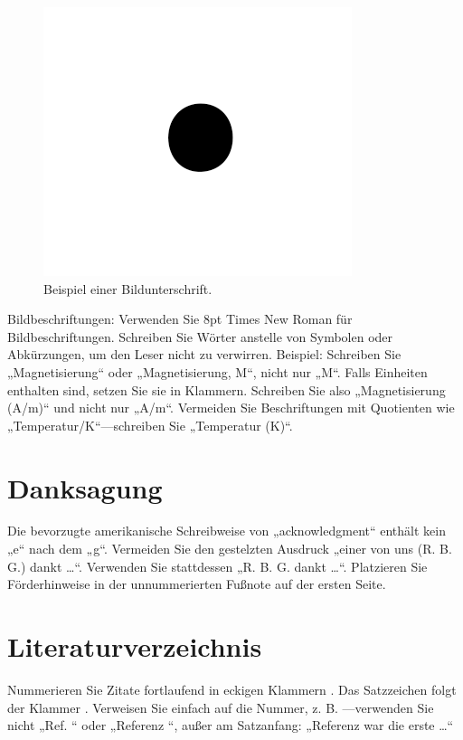 \documentclass[conference]{IEEEtran}
\begin{document}
\begin{figure}[htbp]
\centerline{\includegraphics{fig1.png}}
\caption{Beispiel einer Bildunterschrift.}
\label{fig}
\end{figure}

Bildbeschriftungen: Verwenden Sie 8pt Times New Roman für Bildbeschriftungen. Schreiben Sie Wörter
anstelle von Symbolen oder Abkürzungen, um den Leser nicht zu verwirren. Beispiel: Schreiben Sie
„Magnetisierung“ oder „Magnetisierung, M“, nicht nur „M“. Falls Einheiten enthalten sind, setzen Sie sie in Klammern. Schreiben Sie also „Magnetisierung (A/m)“ und nicht nur „A/m“. Vermeiden Sie Beschriftungen mit Quotienten wie „Temperatur/K“—schreiben Sie „Temperatur (K)“.

\section*{Danksagung}

Die bevorzugte amerikanische Schreibweise von „acknowledgment“ enthält
kein „e“ nach dem „g“. Vermeiden Sie den gestelzten Ausdruck „einer von uns (R. B. G.) dankt …“. Verwenden Sie stattdessen „R. B. G. dankt …“. Platzieren Sie Förderhinweise in der unnummerierten Fußnote auf der ersten Seite.

\section*{Literaturverzeichnis}

Nummerieren Sie Zitate fortlaufend in eckigen Klammern \cite{b1}.
Das Satzzeichen folgt der Klammer \cite{b2}. Verweisen Sie einfach auf die Nummer,
z. B. \cite{b3}—verwenden Sie nicht „Ref. \cite{b3}“ oder „Referenz \cite{b3}“, außer am
Satzanfang: „Referenz \cite{b3} war die erste …“
\end{document}
